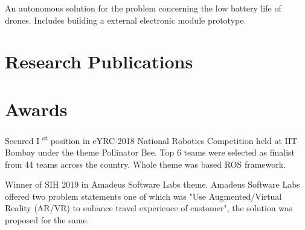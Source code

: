 \documentclass[]{deedy-resume-openfont}
\begin{document}
\begin{minipage}[t]{0.60\textwidth}
An autonomous solution for the problem concerning the low battery life of drones. Includes building a external electronic module prototype.\\
\sectionsep

\hline
\section{Research Publications}

\sectionsep

\hline
\section{Awards}

Secured I \textsuperscript{st} position in eYRC-2018 National Robotics Competition held at IIT Bombay under the theme Pollinator Bee. Top 6 teams were selected as finalist from 44 teams across the country. Whole theme was based ROS framework. 
\sectionsep

Winner of SIH 2019 in Amadeus Software Labs theme. Amadeus Software Labs offered two problem statements one of which was "Use Augmented/Virtual Reality (AR/VR) to enhance travel experience of customer", the solution was proposed for the same.
\sectionsep


\end{minipage} 
\end{document}
